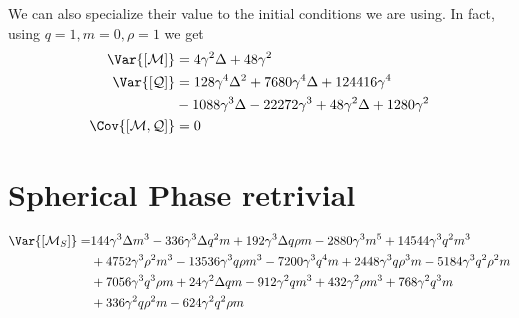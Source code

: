 We can also specialize their value to the initial conditions we are using.
In fact, using \(q=1, m=0, \rho=1\) we get
\[\begin{split}
  \Var{[\mathcal{M}]} &= 4 \gamma ^2 \Delta +48 \gamma ^2 \\
  \Var{[\mathcal{Q}]} &= 128 \gamma ^4 \Delta ^2+7680 \gamma ^4 \Delta +124416 \gamma ^4 \\
                      &-1088 \gamma ^3 \Delta -22272 \gamma ^3+48 \gamma ^2 \Delta +1280 \gamma ^2 \\
  \Cov{[\mathcal{M},\mathcal{Q}]} &= 0
\end{split}\]

\section{Spherical Phase retrivial}
\[\begin{split}
  \Var{[\mathcal{M}_S]} =& 144 \gamma ^3 \Delta  m^3-336 \gamma ^3 \Delta  q^2 m+192 \gamma ^3 \Delta  q \rho m-2880 \gamma ^3 m^5+14544 \gamma ^3 q^2 m^3 \\
                         &+4752 \gamma ^3 \rho^2 m^3-13536 \gamma ^3 q \rho m^3-7200 \gamma ^3 q^4 m+2448 \gamma ^3 q \rho^3 m-5184 \gamma ^3 q^2 \rho^2 m \\
                         &+7056 \gamma ^3 q^3 \rho m+24 \gamma ^2 \Delta  q m-912 \gamma ^2 q m^3+432 \gamma ^2 \rho m^3+768 \gamma ^2 q^3 m \\
                         &+336 \gamma ^2 q \rho^2 m-624 \gamma ^2 q^2 \rho m
\end{split}\]